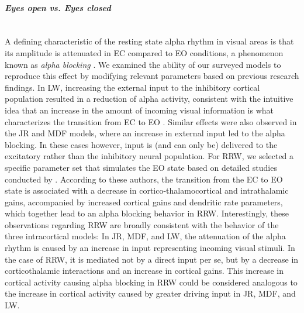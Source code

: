 \documentclass[12pt,twoside]{article}
\begin{document}

\paragraph{\textit{Eyes open vs. Eyes closed}} ~\\
A defining characteristic of the resting state alpha rhythm in visual areas is that its amplitude is attenuated in EC compared to EO conditions, a phenomenon known as \textit{alpha blocking} \citep{barry2017eeg, adrian1934berger, chapman1962quantitative}. We examined the ability of our surveyed models to reproduce this effect by modifying relevant parameters based on previous research findings. In LW, increasing the external input to the inhibitory cortical population resulted in a reduction of alpha activity, consistent with the intuitive idea that an increase in the amount of incoming visual information is what characterizes the transition from EC to EO \citep{hartoyo2020inferring}. Similar effects were also observed in the JR and MDF models, where an increase in external input led to the alpha blocking. In these cases however, input is (and can only be) delivered to the excitatory rather than the inhibitory neural population. 
For RRW, we selected a specific parameter set that simulates the EO state based on detailed studies conducted by
\citet{rowe2004estimation}. According to these authors, the transition from the EC to EO state is associated with a decrease in cortico-thalamocortical and intrathalamic gains, accompanied by increased cortical gains and dendritic rate parameters, which together lead to an alpha blocking behavior in RRW. Interestingly, these observations regarding RRW are broadly consistent with the behavior of the three intracortical models: In JR, MDF, and LW, the attenuation of the alpha rhythm is caused by an increase in input representing incoming visual stimuli. In the case of RRW, it is mediated not by a direct input per se, but by a decrease in corticothalamic interactions and an increase in cortical gains. This increase in cortical activity causing alpha blocking in RRW could be considered analogous to the increase in cortical activity caused by greater driving input in JR, MDF, and LW.
\end{document}
